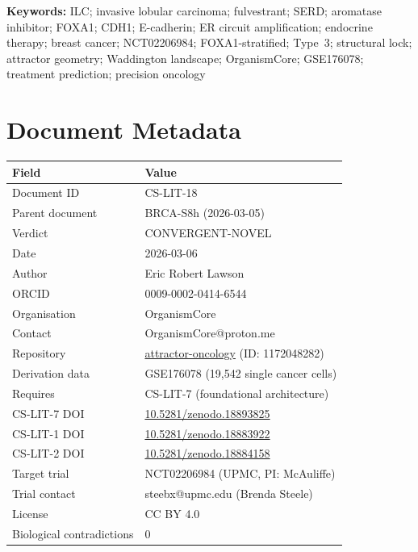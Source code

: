 \documentclass[12pt, a4paper]{article}
\begin{document}
\vspace{0.5em}
\noindent\textbf{Keywords:}
ILC; invasive lobular carcinoma; fulvestrant; SERD;
aromatase inhibitor; FOXA1; CDH1; E-cadherin; ER
circuit amplification; endocrine therapy; breast cancer;
NCT02206984; FOXA1-stratified; Type~3; structural lock;
attractor geometry; Waddington landscape; OrganismCore;
GSE176078; treatment prediction; precision oncology

\newpage
\tableofcontents
\newpage

\section{Document Metadata}

\begin{center}
\begin{tabular}{ll}
\toprule
\textbf{Field} & \textbf{Value} \\
\midrule
Document ID & CS-LIT-18 \\
Parent document & BRCA-S8h (2026-03-05) \\
Verdict & CONVERGENT-NOVEL \\
Date & 2026-03-06 \\
Author & Eric Robert Lawson \\
ORCID & 0009-0002-0414-6544 \\
Organisation & OrganismCore \\
Contact & OrganismCore@proton.me \\
Repository &
\href{https://github.com/Eric-Robert-Lawson/attractor-oncology}
{attractor-oncology} (ID: 1172048282) \\
Derivation data & GSE176078 (19,542 single cancer cells) \\
Requires & CS-LIT-7 (foundational architecture) \\
CS-LIT-7 DOI &
\href{https://doi.org/10.5281/zenodo.18893825}
{10.5281/zenodo.18893825} \\
CS-LIT-1 DOI &
\href{https://doi.org/10.5281/zenodo.18883922}
{10.5281/zenodo.18883922} \\
CS-LIT-2 DOI &
\href{https://doi.org/10.5281/zenodo.18884158}
{10.5281/zenodo.18884158} \\
Target trial & NCT02206984 (UPMC, PI: McAuliffe) \\
Trial contact & steebx@upmc.edu (Brenda Steele) \\
License & CC BY 4.0 \\
Biological contradictions & 0 \\
\bottomrule
\end{tabular}
\end{center}
\end{document}
